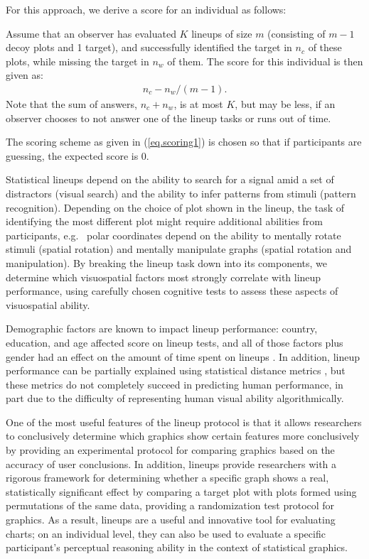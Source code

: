 \documentclass[journal]{vgtc}\usepackage[]{graphicx}\usepackage[]{color}
\begin{document}
For this approach, we derive a score for an individual as follows:

Assume that an observer has evaluated $K$ lineups of size $m$ (consisting of $m-1$ decoy plots and 1 target), and successfully identified the target in $n_c$ of these plots, while missing the target in $n_w$ of them. 
The score for this individual is then given as:
\begin{eqnarray}\label{eq.scoring1}
n_c - n_w/(m-1).
\end{eqnarray}
Note that the sum of answers, $n_c + n_w$, is at most $K$, but may be less, if an observer chooses to not answer one of the lineup tasks or runs out of time.

The scoring scheme as given in (\ref{eq.scoring1}) is chosen so that if participants are guessing, the expected score is 0. 

Statistical lineups depend on the ability to search for a signal amid a set of distractors (visual search) and the ability to infer patterns from stimuli (pattern recognition). Depending on the choice of plot shown in the lineup, the task of identifying the most different plot might require additional abilities from   participants, e.g.~ polar coordinates depend on the ability to mentally rotate stimuli (spatial rotation) and mentally manipulate graphs (spatial rotation and manipulation). By breaking the lineup task down into its components, we  determine which visuospatial factors most strongly correlate with lineup performance, using carefully chosen cognitive tests to assess these aspects of visuospatial ability. 

Demographic factors are known to impact lineup performance: country, education, and age affected score on lineup tests, and all of those factors plus gender had an effect on the amount of time spent on lineups \cite{humanfactorslineups}. In addition, lineup performance can be partially explained using statistical distance metrics \cite{distancemetriclineups}, but these metrics do not completely succeed in predicting human performance, in part due to the difficulty of representing human visual ability algorithmically.


One of the most useful features of the lineup protocol is that it allows researchers to conclusively determine which graphics show certain features more conclusively by providing an experimental protocol for comparing graphics based on the accuracy of user conclusions. In addition, lineups provide researchers with a rigorous framework for determining whether a specific graph shows a real, statistically significant effect by comparing a target plot with plots formed using permutations of the same data, providing a randomization test protocol for graphics. As a result, lineups are a useful and innovative tool for evaluating charts; on an individual level, they can also be used to evaluate a specific participant's perceptual reasoning ability in the context of statistical graphics.
\end{document}
